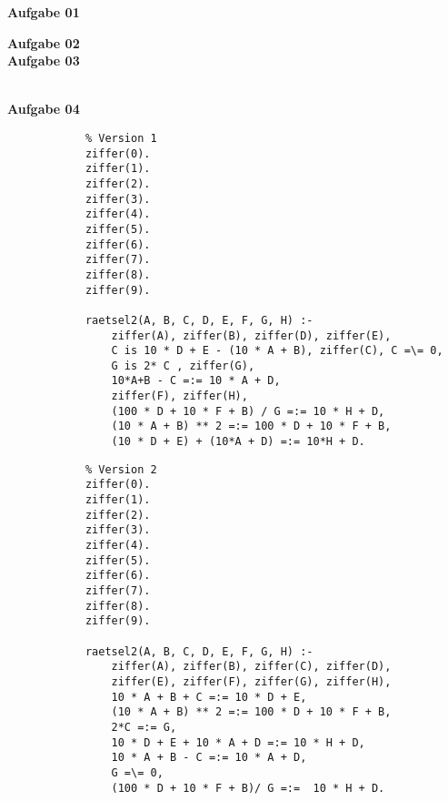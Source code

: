 \documentclass[a4paper,10pt]{article}
\begin{document}
	\parindent0pt
	\textbf{Aufgabe 01}
	\begin{compactenum} [(a)]
		\item 
		\item 
		\item 
	\end{compactenum}
	\textbf{Aufgabe 02} \\
	
	\textbf{Aufgabe 03}
	\begin{compactenum} [(a)]
		\item
		\item 
		\item 
		\item 
	\end{compactenum}\ \\

	\textbf{Aufgabe 04}
	\begin{compactenum} [(a)]
		\item \begin{compactenum} [(V 1)]
			\item 
			\begin{verbatim}
			% Version 1
			ziffer(0).
			ziffer(1).
			ziffer(2).
			ziffer(3).
			ziffer(4).
			ziffer(5).
			ziffer(6).
			ziffer(7).
			ziffer(8).
			ziffer(9).
			
			raetsel2(A, B, C, D, E, F, G, H) :-
				ziffer(A), ziffer(B), ziffer(D), ziffer(E),
				C is 10 * D + E - (10 * A + B), ziffer(C), C =\= 0,
				G is 2* C , ziffer(G),
				10*A+B - C =:= 10 * A + D,
				ziffer(F), ziffer(H),
				(100 * D + 10 * F + B) / G =:= 10 * H + D,
				(10 * A + B) ** 2 =:= 100 * D + 10 * F + B,
				(10 * D + E) + (10*A + D) =:= 10*H + D.
			\end{verbatim}
			\item 
			\begin{verbatim}
			% Version 2
			ziffer(0).
			ziffer(1).
			ziffer(2).
			ziffer(3).
			ziffer(4).
			ziffer(5).
			ziffer(6).
			ziffer(7).
			ziffer(8).
			ziffer(9).
			
			raetsel2(A, B, C, D, E, F, G, H) :-
				ziffer(A), ziffer(B), ziffer(C), ziffer(D),
				ziffer(E), ziffer(F), ziffer(G), ziffer(H),
				10 * A + B + C =:= 10 * D + E,
				(10 * A + B) ** 2 =:= 100 * D + 10 * F + B,
				2*C =:= G,
				10 * D + E + 10 * A + D =:= 10 * H + D,
				10 * A + B - C =:= 10 * A + D,
				G =\= 0,
				(100 * D + 10 * F + B)/ G =:=  10 * H + D.
			\end{verbatim}
		\end{compactenum}\
		\item 
		\begin{verbatim}
		
		\end{verbatim}
	\end{compactenum}
\end{document}
